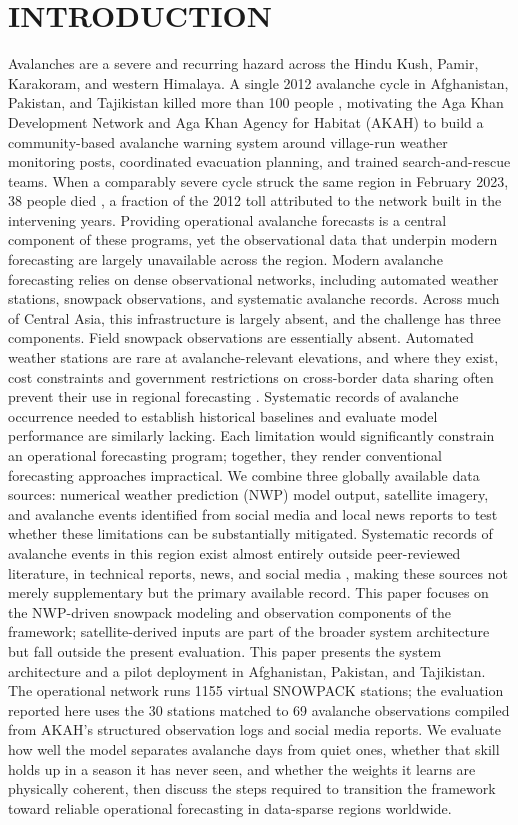 \documentclass{issw}
\begin{document}
\section{INTRODUCTION}
Avalanches are a severe and recurring hazard across the Hindu Kush, Pamir, Karakoram, and western Himalaya. A single 2012 avalanche cycle in Afghanistan, Pakistan, and Tajikistan killed more than 100 people \parencite{ChabotKaba2016}, motivating the Aga Khan Development Network and Aga Khan Agency for Habitat (AKAH) to build a community-based avalanche warning system around village-run weather monitoring posts, coordinated evacuation planning, and trained search-and-rescue teams. When a comparably severe cycle struck the same region in February 2023, 38 people died \parencite{Chabot2024}, a fraction of the 2012 toll attributed to the network built in the intervening years. Providing operational avalanche forecasts is a central component of these programs, yet the observational data that underpin modern forecasting are largely unavailable across the region.
Modern avalanche forecasting relies on dense observational networks, including automated weather stations, snowpack observations, and systematic avalanche records. Across much of Central Asia, this infrastructure is largely absent, and the challenge has three components. Field snowpack observations are essentially absent. Automated weather stations are rare at avalanche-relevant elevations, and where they exist, cost constraints and government restrictions on cross-border data sharing often prevent their use in regional forecasting \parencite{Chabot2024}. Systematic records of avalanche occurrence needed to establish historical baselines and evaluate model performance are similarly lacking. Each limitation would significantly constrain an operational forecasting program; together, they render conventional forecasting approaches impractical.
We combine three globally available data sources: numerical weather prediction (NWP) model output, satellite imagery, and avalanche events identified from social media and local news reports to test whether these limitations can be substantially mitigated. Systematic records of avalanche events in this region exist almost entirely outside peer-reviewed literature, in technical reports, news, and social media \parencite{Acharya2023}, making these sources not merely supplementary but the primary available record. This paper focuses on the NWP-driven snowpack modeling and observation components of the framework; satellite-derived inputs are part of the broader system architecture but fall outside the present evaluation.
This paper presents the system architecture and a pilot deployment in Afghanistan, Pakistan, and Tajikistan. The operational network runs 1155 virtual SNOWPACK stations; the evaluation reported here uses the 30 stations matched to 69 avalanche observations compiled from AKAH's structured observation logs and social media reports. We evaluate how well the model separates avalanche days from quiet ones, whether that skill holds up in a season it has never seen, and whether the weights it learns are physically coherent, then discuss the steps required to transition the framework toward reliable operational forecasting in data-sparse regions worldwide.
\end{document}
